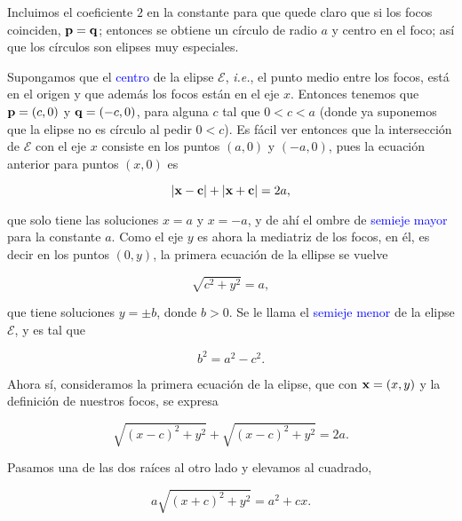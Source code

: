 \documentclass{article}
\theoremstyle{definicion}
\theoremstyle{definition}             %
\theoremstyle{definition}             %
\theoremstyle{definition}
\theoremstyle{definition}
\theoremstyle{observacion}
\theoremstyle{definition}
\theoremstyle{plain}
\theoremstyle{definition}
\theoremstyle{afirmacion}
\theoremstyle{notation}
\theoremstyle{definition}
\begin{document}
    Incluimos el coeficiente \(2\) en la constante para que quede claro que si los focos coinciden, \(\vb{p} = \vb{q}\); entonces se obtiene un círculo de radio \(a\) y centro en el foco; así que los círculos son elipses muy especiales.

    Supongamos que el \textcolor{blue}{centro} de la elipse \(\mathcal{E}\), \emph{i.e.}, el punto medio entre los focos, está en el origen y que además los focos están en el eje \(x\). Entonces tenemos que \(\vb{p} = (c, 0)\) y \(\vb{q} = (-c, 0)\), para alguna \(c\) tal que \(0 < c < a\) (donde ya suponemos que la elipse no es círculo al pedir \(0 < c\)). Es fácil ver entonces que la intersección de \(\mathcal{E}\) con el eje \(x\) consiste en los puntos \((a, 0)\) y \((-a, 0)\), pues la ecuación anterior para puntos \((x, 0)\) es 

    \begin{equation*}
        \abs{\vb{x} - \vb{c}} + \abs{\vb{x} + \vb{c}} = 2a,
    \end{equation*}

    que solo tiene las soluciones \(x = a\) y \(x = -a\), y de ahí el ombre de \textcolor{blue}{semieje mayor} para la constante \(a\). Como el eje \(y\) es ahora la mediatriz de los focos, en él, es decir en los puntos \((0, y)\), la primera ecuación de la ellipse se vuelve
    
    \begin{equation*}
        \sqrt{c^{2} + y^{2}} = a,
    \end{equation*}

    que tiene soluciones \(y = \pm b\), donde \(b > 0\). Se le llama el \textcolor{blue}{semieje menor} de la elipse \(\mathcal{E}\), y es tal que

    \begin{equation*}
        b^{2} = a^{2} - c^{2}. 
    \end{equation*}

    Ahora sí, consideramos la primera ecuación de la elipse, que con \(\vb{x} = (x, y)\) y la definición de nuestros focos, se expresa

    \begin{equation*}
        \sqrt{(x - c)^{2} + y^{2}} + \sqrt{(x - c)^{2} + y^{2}}= 2a.
    \end{equation*}

    Pasamos una de las dos raíces al otro lado y elevamos al cuadrado, 

    \begin{equation*}
        a\sqrt{(x + c)^{2} + y^{2}} = a^{2} + cx.	
    \end{equation*}
\end{document}
